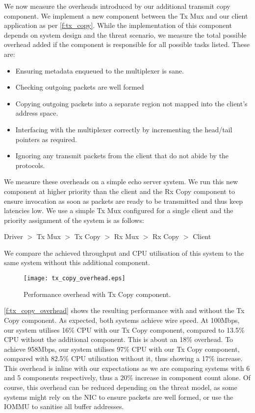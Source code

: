 We now measure the overheads introduced by our additional transmit copy component. We implement a new
component between the Tx Mux and our client application as per \autoref{f:tx_copy}. While the implementation
of this component depends on system design and the threat scenario, we measure the total possible overhead
added if the component is responsible for all possible tasks listed. These are:
\begin{itemize}
    \item Ensuring metadata enqueued to the multiplexer is sane.
    \item Checking outgoing packets are well formed 
    \item Copying outgoing packets into a separate region not mapped
          into the client's address space.
    \item Interfacing with the multiplexer correctly by incrementing the head/tail pointers as required.
    \item Ignoring any transmit packets from the client that do not abide by the protocols.
\end{itemize}

We measure these overheads on a simple echo server system. We run this new component at higher priority than the client
and the Rx Copy component to ensure invocation as soon as packets are ready to be transmitted and thus keep
latencies low. We use a simple Tx Mux configured for a single client and the priority assignment of the system is as follows:\\
\centerline{Driver \(>\) Tx Mux  \(>\) Tx Copy \(>\) Rx Mux \(>\) Rx Copy \(>\) Client}

We compare the achieved throughput and CPU utilisation of this system to the same system without this additional component. 

\begin{figure}[h]
    \centering
    \texttt{[image: tx\_copy\_overhead.eps]}
    \caption{Performance overhead with Tx Copy component.}
    \label{f:tx_copy_overhead}
\end{figure}

\autoref{f:tx_copy_overhead} shows the resulting performance with and without the Tx Copy component. As expected, both
systems achieve wire speed. At 100Mbps, our system utilises 16\% CPU with our Tx Copy component, compared to 13.5\% CPU 
without the additional component. This is about an 18\% overhead. To achieve 958Mbps, our system utilises 97\% CPU with our Tx
Copy component, compared with 82.5\% CPU utilisation without it, thus showing a 17\% increase. This overhead is 
inline with our expectations as we are comparing systems with 6 and 5 components respectively, thus a 20\% increase
in component count alone. Of course, this overhead can be reduced depending on the threat model, as some systems might
rely on the NIC to ensure packets are well formed, or use the IOMMU to sanitise all buffer addresses.  

